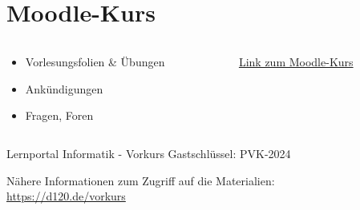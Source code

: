 \section{Moodle-Kurs}
\begin{frame}[c]
    \slidehead
    \begin{columns}[c]
        \begin{column}{.6\linewidth}
            \centering
            \begin{itemize}
                \item Vorlesungsfolien \& Übungen
                \item Ankündigungen
                \item Fragen, Foren
            \end{itemize}
        \end{column}%
        \begin{column}{.4\linewidth}
            \begin{figure}
                \centering\mbox{}
                \qrcode[height=2.5cm]{\moodlecourselink}
                \caption{\href{\moodlecourselink}{Link zum Moodle-Kurs}}
            \end{figure}
        \end{column}
    \end{columns}
    \vspace{-1em}
    \begin{block}{Lernportal Informatik - Vorkurs}
        {\Huge Gastschlüssel: PVK-2024}

        \vspace{1em}Nähere Informationen zum Zugriff auf die Materialien:\\
        \href{https://d120.de/vorkurs}{https://d120.de/vorkurs}
    \end{block}
\end{frame}


